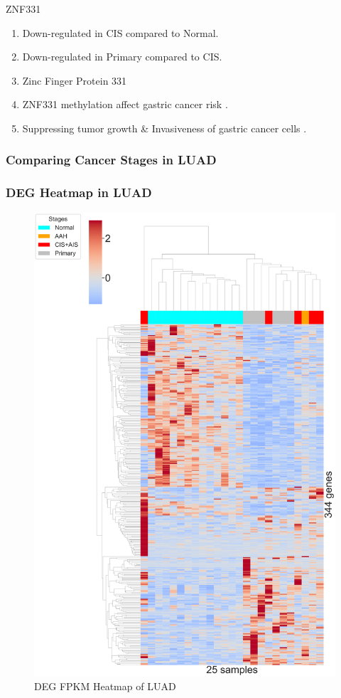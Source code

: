 \documentclass{beamer}
\begin{document}
\begin{frame}[allowframebreaks]
        \begin{block}{ZNF331}
            \begin{enumerate}
                \item Down-regulated in CIS compared to Normal.
                \item Down-regulated in Primary compared to CIS.
                \item Zinc Finger Protein 331
                \item ZNF331 methylation affect gastric cancer risk \cite{ZNF331-1}.
                \item Suppressing tumor growth \& Invasiveness of gastric cancer cells \cite{ZNF331-2}.
            \end{enumerate}
        \end{block}
    \end{frame}

    \subsubsection{Comparing Cancer Stages in LUAD}
    \begin{frame}
        \frametitle{DEG Heatmap in LUAD}

        \begin{figure}
            \includegraphics[width=0.35 \linewidth]{figures/DEG/Cluster/STAR.FPKM.ADC.pdf}
            \caption{DEG FPKM Heatmap of LUAD}
        \end{figure}
    \end{frame}
\end{document}
